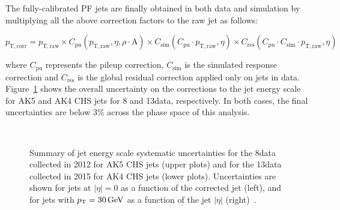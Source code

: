 The fully-calibrated PF jets are finally obtained in both data and simulation by multiplying all the above correction factors to the raw jet \pt as follows:

\begin{equation}
p_\mathrm{T,corr} = p_\mathrm{T,raw} \times C_\mathrm{pu}(p_\mathrm{T,raw},\eta,\rho\cdot\mathrm{A}) \times C_\mathrm{sim}(C_\mathrm{pu} \cdot p_\mathrm{T,raw},\eta) \times C_\mathrm{res}(C_\mathrm{pu} \cdot C_\mathrm{sim} \cdot p_\mathrm{T,raw},\eta)
\end{equation}

\noindent where $C_\mathrm{pu}$ represents the pileup correction, $C_\mathrm{sim}$ is the simulated response correction and $C_\mathrm{res}$ is the global residual correction applied only on jets in data.
Figure~\ref{fig:jesunc813TeV} shows the overall uncertainty on the corrections to the jet energy scale for AK5 and AK4 CHS jets for 8 and 13\TeV data, respectively. In both cases, the final uncertainties are below 3\% across the phase space of this analysis.

\begin{figure}[!htb]
\centering
{}
\\
\caption{Summary of jet energy scale systematic uncertainties for the 8\TeV data collected in 2012 for AK5 CHS jets (upper plots) and for the 13\TeV data collected in 2015 for AK4 CHS jets (lower plots). Uncertainties are shown for jets at $|\eta| = 0$ as a function of the corrected jet \pt (left), and for jets with $p_{\mathrm{T}} = 30\,\text{Ge\hspace{-.08em}V}$ as a function of the jet $|\eta|$ (right)~\cite{Khachatryan:2016kdb,CMS-DP-2016-020}.}
\label{fig:jesunc813TeV}
\end{figure}

